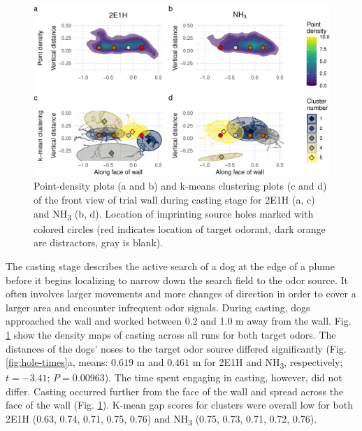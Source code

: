 \documentclass[
]{article}
\begin{document}
\begin{figure}
\centering
\includegraphics{main-manuscript_files/figure-latex/frontwall-casting-1.pdf}
\caption{\label{fig:frontwall-casting}Point-density plots (a and b) and k-means clustering plots (c and d) of the front view of trial wall during casting stage for 2E1H (a, c) and NH\textsubscript{3} (b, d). Location of imprinting source holes marked with colored circles (red indicates location of target odorant, dark orange are distractors, gray is blank).}
\end{figure}

The casting stage describes the active search of a dog at the edge of a plume before it begins localizing to narrow down the search field to the odor source. It often involves larger movements and more changes of direction in order to cover a larger area and encounter infrequent odor signals. During casting, dogs approached the wall and worked between 0.2 and 1.0 m away from the wall. Fig. \ref{fig:frontwall-casting} show the density maps of casting across all runs for both target odors. The distances of the dogs' noses to the target odor source differed significantly (Fig. \ref{fig:hole-times}a, means: \(0.619\) m and \(0.461\) m for 2E1H and NH\textsubscript{3}, respectively; \(t = -3.41\); \(P = 0.00963\)). The time spent engaging in casting, however, did not differ. Casting occurred further from the face of the wall and spread across the face of the wall (Fig. \ref{fig:frontwall-casting}). K-mean gap scores for clusters were overall low for both 2E1H (0.63, 0.74, 0.71, 0.75, 0.76) and NH\textsubscript{3} (0.75, 0.73, 0.71, 0.72, 0.76).
\end{document}
